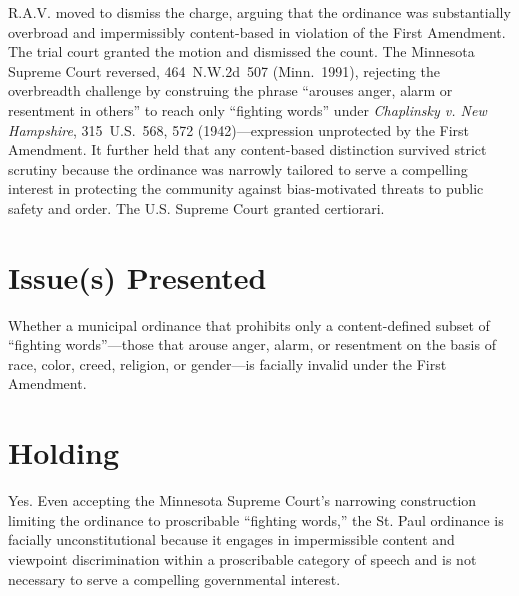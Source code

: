 \documentclass[12pt]{article}
\begin{document}
R.A.V. moved to dismiss the charge, arguing that the ordinance was substantially overbroad and impermissibly content-based in violation of the First Amendment. The trial court granted the motion and dismissed the count. The Minnesota Supreme Court reversed, 464~N.W.2d~507 (Minn.~1991), rejecting the overbreadth challenge by construing the phrase ``arouses anger, alarm or resentment in others'' to reach only ``fighting words'' under \textit{Chaplinsky v. New Hampshire}, 315~U.S.~568, 572 (1942)---expression unprotected by the First Amendment. It further held that any content-based distinction survived strict scrutiny because the ordinance was narrowly tailored to serve a compelling interest in protecting the community against bias-motivated threats to public safety and order. The U.S. Supreme Court granted certiorari.

\section{Issue(s) Presented}
Whether a municipal ordinance that prohibits only a content-defined subset of ``fighting words''---those that arouse anger, alarm, or resentment on the basis of race, color, creed, religion, or gender---is facially invalid under the First Amendment.

\section{Holding}
Yes. Even accepting the Minnesota Supreme Court's narrowing construction limiting the ordinance to proscribable ``fighting words,'' the St. Paul ordinance is facially unconstitutional because it engages in impermissible content and viewpoint discrimination within a proscribable category of speech and is not necessary to serve a compelling governmental interest.
\end{document}
